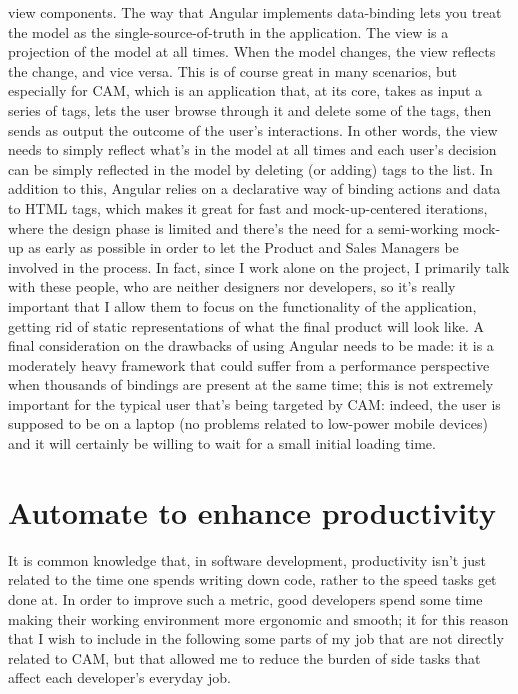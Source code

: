 \documentclass[12pt,svgnames]{memoir}
\begin{document}
view components. The way that Angular implements data-binding lets you
treat the model as the single-source-of-truth in the application. The
view is a projection of the model at all times. When the model changes,
the view reflects the change, and vice versa. This is of course great in
many scenarios, but especially for CAM, which is an application that, at
its core, takes as input a series of tags, lets the user browse through
it and delete some of the tags, then sends as output the outcome of the
user's interactions. In other words, the view needs to simply reflect
what's in the model at all times and each user's decision can be simply
reflected in the model by deleting (or adding) tags to the list. In
addition to this, Angular relies on a declarative way of binding actions
and data to HTML tags, which makes it great for fast and
mock-up-centered iterations, where the design phase is limited and
there's the need for a semi-working mock-up as early as possible in
order to let the Product and Sales Managers be involved in the process.
In fact, since I work alone on the project, I primarily talk with these
people, who are neither designers nor developers, so it's really
important that I allow them to focus on the functionality of the
application, getting rid of static representations of what the final
product will look like. A final consideration on the drawbacks of using
Angular needs to be made: it is a moderately heavy framework that could
suffer from a performance perspective when thousands of bindings are
present at the same time; this is not extremely important for the
typical user that's being targeted by CAM: indeed, the user is supposed
to be on a laptop (no problems related to low-power mobile devices) and
it will certainly be willing to wait for a small initial loading time.

\section{Automate to enhance
productivity}\label{automate-to-enhance-productivity}

It is common knowledge that, in software development, productivity isn't
just related to the time one spends writing down code, rather to the
speed tasks get done at. In order to improve such a metric, good
developers spend some time making their working environment more
ergonomic and smooth; it for this reason that I wish to include in the
following some parts of my job that are not directly related to CAM, but
that allowed me to reduce the burden of side tasks that affect each
developer's everyday job.
\end{document}
